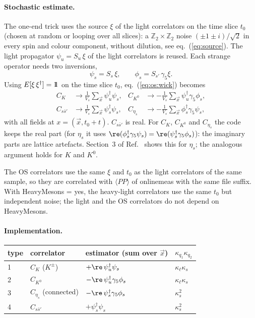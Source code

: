 \paragraph{Stochastic estimate.}
The one-end trick uses the source $\xi$ of the light correlators on the time slice $t_0$
(chosen at random or looping over all slices): a $\mathbb Z_2\times\mathbb Z_2$ noise $(\pm1\pm i)/\sqrt2$
in every spin and colour component, without dilution, see eq.~(\ref{eq:source}).
The light propagator $\psi_u = S_u\,\xi$ of the light correlators is reused.
Each strange operator needs two inversions,
\begin{equation}
  \psi_s = S_s\,\xi , \qquad \phi_s = S_{s'}\,\gamma_5\xi .
\end{equation}
Using $E[\xi\,\xi^\dagger]=1\!\!1$ on the time slice $t_0$, eq.~(\ref{eq:os:wick}) becomes
\begin{equation}
  \begin{aligned}
    C_{K} &\to \frac1{V_s}\sum_{\vec x}\psi_u^\dagger\psi_s , &
    C_{K^0} &\to -\frac1{V_s}\sum_{\vec x}\psi_u^\dagger\gamma_5\phi_s , \\
    C_{s\bar s'} &\to \frac1{V_s}\sum_{\vec x}\psi_s^\dagger\psi_s , &
    C_{\eta_s} &\to -\frac1{V_s}\sum_{\vec x}\phi_s^\dagger\gamma_5\psi_s ,
  \end{aligned}
\end{equation}
with all fields at $x=(\vec x,t_0+t)$.
$C_{s\bar s'}$ is real. For $C_K$, $C_{K^0}$ and $C_{\eta_s}$ the code keeps the real part
(for $\eta_s$ it uses $\re(\phi_s^\dagger\gamma_5\psi_s)=\re(\psi_s^\dagger\gamma_5\phi_s)$):
the imaginary parts are lattice artefacts. Section~3 of Ref.~\cite{Ottnad:2015hva} shows this for $\eta_s$;
the analogous argument holds for $K$ and $K^0$.

The OS correlators use the same $\xi$ and $t_0$ as the light correlators of the same sample,
so they are correlated with $\langle PP\rangle$ of {\ttfamily onlinemeas} with the same file suffix.
With {\ttfamily HeavyMesons = yes}, the heavy-light correlators use the same $t_0$ but independent noise;
the light and the OS correlators do not depend on {\ttfamily HeavyMesons}.

\paragraph{Implementation.}
\begin{center}
\begin{tabular}{llll}
  \hline
  type & correlator & estimator (sum over $\vec x$) & $\kappa_{q_1}\kappa_{q_2}$ \\
  \hline
  1 & $C_K$ ($K^\pm$) & $+\re\,\psi_u^\dagger\psi_s$ & $\kappa_\ell\kappa_s$ \\
  2 & $C_{K^0}$ & $-\re\,\psi_u^\dagger\gamma_5\phi_s$ & $\kappa_\ell\kappa_s$ \\
  3 & $C_{\eta_s}$ (connected) & $-\re\,\psi_s^\dagger\gamma_5\phi_s$ & $\kappa_s^2$ \\
  4 & $C_{s\bar s'}$ & $+\psi_s^\dagger\psi_s$ & $\kappa_s^2$ \\
  \hline
\end{tabular}
\end{center}

